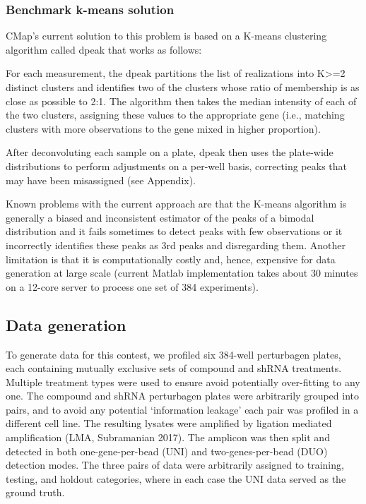 \documentclass[]{article}
\begin{document}
\hypertarget{benchmark-k-means-solution}{%
\subsubsection{Benchmark k-means
solution}\label{benchmark-k-means-solution}}

CMap's current solution to this problem is based on a K-means clustering
algorithm called dpeak that works as follows:

For each measurement, the dpeak partitions the list of realizations into
K\textgreater{}=2 distinct clusters and identifies two of the clusters
whose ratio of membership is as close as possible to 2:1. The algorithm
then takes the median intensity of each of the two clusters, assigning
these values to the appropriate gene (i.e., matching clusters with more
observations to the gene mixed in higher proportion).

After deconvoluting each sample on a plate, dpeak then uses the
plate-wide distributions to perform adjustments on a per-well basis,
correcting peaks that may have been misassigned (see Appendix).

Known problems with the current approach are that the K-means algorithm
is generally a biased and inconsistent estimator of the peaks of a
bimodal distribution and it fails sometimes to detect peaks with few
observations or it incorrectly identifies these peaks as 3rd peaks and
disregarding them. Another limitation is that it is computationally
costly and, hence, expensive for data generation at large scale (current
Matlab implementation takes about 30 minutes on a 12-core server to
process one set of 384 experiments).

\hypertarget{data-generation}{%
\subsection{Data generation}\label{data-generation}}

To generate data for this contest, we profiled six 384-well perturbagen
plates, each containing mutually exclusive sets of compound and shRNA
treatments. Multiple treatment types were used to ensure avoid
potentially over-fitting to any one. The compound and shRNA perturbagen
plates were arbitrarily grouped into pairs, and to avoid any potential
`information leakage' each pair was profiled in a different cell line.
The resulting lysates were amplified by ligation mediated amplification
(LMA, Subramanian 2017). The amplicon was then split and detected in
both one-gene-per-bead (UNI) and two-genes-per-bead (DUO) detection
modes. The three pairs of data were arbitrarily assigned to training,
testing, and holdout categories, where in each case the UNI data served
as the ground truth.
\end{document}
